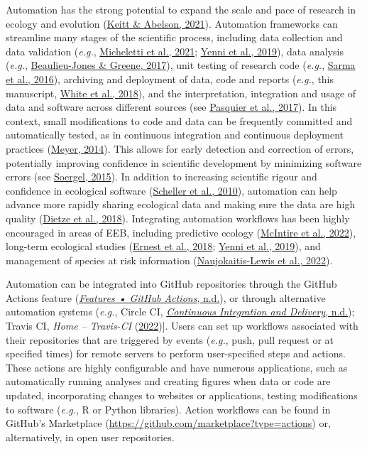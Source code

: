 Automation has the strong potential to expand the scale and pace of research in ecology and evolution (\protect\hyperlink{ref-cfgXxgt1}{Keitt \& Abelson, 2021}).
Automation frameworks can streamline many stages of the scientific process, including data collection and data validation (\emph{e.g.}, \protect\hyperlink{ref-bhDgD6lF}{Micheletti et al., 2021}; \protect\hyperlink{ref-1CJo8lo2v}{Yenni et al., 2019}), data analysis (\emph{e.g.}, \protect\hyperlink{ref-Qh7xTLwz}{Beaulieu-Jones \& Greene, 2017}), unit testing of research code (\emph{e.g.}, \protect\hyperlink{ref-lYazDTau}{Sarma et al., 2016}), archiving and deployment of data, code and reports (\emph{e.g.}, this manuscript, \protect\hyperlink{ref-SirQKFIz}{White et al., 2018}), and the interpretation, integration and usage of data and software across different sources (see \protect\hyperlink{ref-1FJhfqfiX}{Pasquier et al., 2017}).
In this context, small modifications to code and data can be frequently committed and automatically tested, as in continuous integration and continuous deployment practices (\protect\hyperlink{ref-1Ep9EJL6y}{Meyer, 2014}).
This allows for early detection and correction of errors, potentially improving confidence in scientific development by minimizing software errors (see \protect\hyperlink{ref-ufw0ZdnI}{Soergel, 2015}).
In addition to increasing scientific rigour and confidence in ecological software (\protect\hyperlink{ref-12103x16N}{Scheller et al., 2010}), automation can help advance more rapidly sharing ecological data and making sure the data are high quality (\protect\hyperlink{ref-rTbinQMj}{Dietze et al., 2018}).
Integrating automation workflows has been highly encouraged in areas of EEB, including predictive ecology (\protect\hyperlink{ref-mmCOSRfr}{McIntire et al., 2022}), long-term ecological studies (\protect\hyperlink{ref-RxK4CmfR}{Ernest et al., 2018}; \protect\hyperlink{ref-1CJo8lo2v}{Yenni et al., 2019}), and management of species at risk information (\protect\hyperlink{ref-kZzfmBNu}{Naujokaitis-Lewis et al., 2022}).

Automation can be integrated into GitHub repositories through the GitHub Actions feature (\protect\hyperlink{ref-NUXbp429}{\emph{Features • GitHub Actions}, n.d.}), or through alternative automation systems (\emph{e.g.}, Circle CI, \protect\hyperlink{ref-T03Api6e}{\emph{Continuous Integration and Delivery}, n.d.}); Travis CI, \emph{Home -- Travis-CI} (\protect\hyperlink{ref-YeFSbfFV}{2022}){]}.
Users can set up workflows associated with their repositories that are triggered by events (\emph{e.g.}, push, pull request or at specified times) for remote servers to perform user-specified steps and actions.
These actions are highly configurable and have numerous applications, such as automatically running analyses and creating figures when data or code are updated, incorporating changes to websites or applications, testing modifications to software (\emph{e.g.}, R or Python libraries).
Action workflows can be found in GitHub's Marketplace (\url{https://github.com/marketplace?type=actions}) or, alternatively, in open user repositories.

